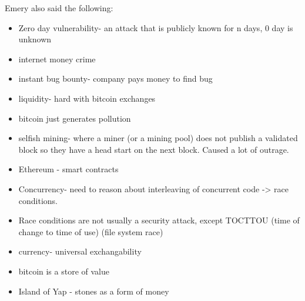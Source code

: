 \documentclass[twoside]{article}
\begin{document}
Emery also said the following: 
\begin{itemize}
        \item Zero day vulnerability- an attack that is publicly known for n days, 0 day is unknown
        \item internet money crime
        \item instant bug bounty- company pays money to find bug
        \item liquidity- hard with bitcoin exchanges
        \item bitcoin just generates pollution
        \item selfish mining- where a miner (or a mining pool) does not publish a validated block so they have a head start on the next block. Caused a lot of outrage.
        \item Ethereum - smart contracts
        \item Concurrency- need to reason about interleaving of concurrent code -> race conditions.
        \item Race conditions are not usually a security attack, except TOCTTOU (time of change to time of use) (file system race)
        \item currency- universal exchangability
        \item bitcoin is a store of value
        \item Island of Yap - stones as a form of money
        
    \end{itemize}
\end{document}
